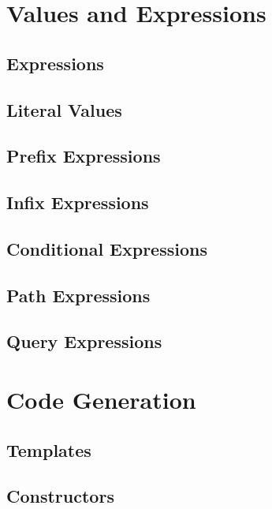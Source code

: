\documentclass[a4paper,oneside,12pt, extrafontsizes]{memoir}
\theoremstyle{definition}
\theoremstyle{definition}
\theoremstyle{definition}
\theoremstyle{definition}
\begin{document}
\part{Values and Expressions}

\chapter{Expressions}
\label{ch:expressions}


\chapter{Literal Values}
\label{ch:literals}

\chapter{Prefix Expressions}
\label{ch:prefix}

\chapter{Infix Expressions}
\label{ch:infix}

\chapter{Conditional Expressions}
\label{ch:conditionals}

\chapter{Path Expressions}
\label{ch:paths}

\chapter{Query Expressions}
\label{ch:queries}

\part{Code Generation}

\chapter{Templates}
\label{sec:templates}

\chapter{Constructors}
\label{sec:constructors}
\end{document}
